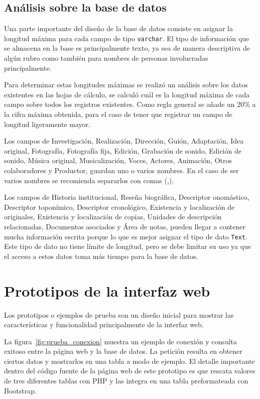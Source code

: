 \documentclass[10pt,letterpaper]{article}
\begin{document}
\subsection{Análisis sobre la base de datos}
Una parte importante del diseño de la base de datos consiste en asignar la longitud máxima para cada campo de tipo \verb|varchar|. El tipo de información que se almacena en la base es principalmente texto, ya sea de manera descriptiva de algún rubro como también para nombres de personas involucradas principalmente.

Para determinar estas longitudes máximas se realizó un análisis sobre los datos existentes en las hojas de cálculo, se calculó cuál es la longitud máxima de cada campo sobre todos los registros existentes. Como regla general se añade un 20\% a la cifra máxima obtenida, para el caso de tener que registrar un campo de longitud ligeramente mayor.

Los campos de Investigación, Realización, Dirección, Guión, Adaptación, Idea original, Fotografía, Fotografía fija, Edición, Grabación de sonido, Edición de sonido, Música original, Musicalización, Voces, Actores, Animación, Otros colaboradores y Productor, guardan uno o varios nombres. En el caso de ser varios nombres se recomienda separarlos con comas (,).

Los campos de Historia institucional, Reseña biográfica, Descriptor onomástico, Descriptor toponímico, Descriptor cronológico, Existencia y localización de originales, Existencia y localización de copias, Unidades de descripción relacionadas, Documentos asociados y Área de notas, pueden llegar a contener mucha información escrita porque lo que es mejor asignar el tipo de dato \verb|Text|. Este tipo de dato no tiene límite de longitud, pero se debe limitar su uso ya que el acceso a estos datos toma más tiempo para la base de datos.

\section{Prototipos de la interfaz web}
Los prototipos o ejemplos de prueba son un diseño inicial para mostrar las características y funcionalidad principalmente de la interfaz web.

La figura~\ref{fig:prueba_conexion} muestra un ejemplo de conexión y consulta exitoso entre la página web y la base de datos. La petición resulta en obtener ciertos datos y mostrarlos en una tabla a modo de ejemplo. El detalle importante dentro del código fuente de la página web de este prototipo es que rescata valores de tres diferentes tablas con PHP y las integra en una tabla preformateada con Bootstrap.
\end{document}
